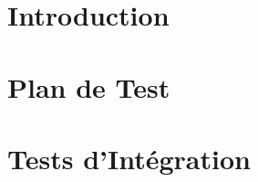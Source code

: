 \documentclass[asi]{picInsa}
\title{\PTI{}}
\author{\Michel} %
\begin{document}
\couverture{}

 \informationsGenerales{}


\tableofcontents

\setcounter{chapter}{0}

\chapter{Introduction}
\label{introduction}


\chapter{Plan de Test}
\label{planDeTest}


\chapter{Tests d'Intégration}
\label{testsDIntegration}

\pageQuatriemeCouverture
\end{document}
